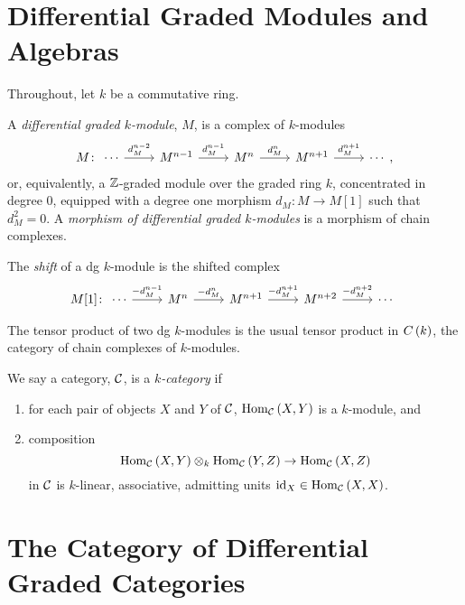 \documentclass[dissertation.tex]{subfiles}
\begin{document}
\section{Differential Graded Modules and Algebras}
{\noindent Throughout, let $k$ be a commutative ring.}
        
\begin{defn}
  A {\it differential graded $k$-module}, $M$, is a complex of $k$-modules
  $$M \colon \begin{tikzcd}
    \cdots \arrow{r}{d_M^{n-2}} & M^{n-1} \arrow{r}{d_M^{n-1}} & M^n \arrow{r}{d_M^n} & M^{n+1} \arrow{r}{d_M^{n+1}} & \cdots
  \end{tikzcd},$$
  or, equivalently, a $\mathbb{Z}$-graded module over the graded ring $k$, concentrated in degree 0, equipped with a degree one morphism $d_M : M \rightarrow M[1]$ such that $d_M^2 = 0$.
  A {\it morphism of differential graded $k$-modules} is a morphism of chain complexes.
  
  The {\it shift} of a dg $k$-module is the shifted complex
  $$M[1] \colon \begin{tikzcd}
    \cdots \arrow{r}{-d_M^{n-1}} & M^{n} \arrow{r}{-d_M^{n}} & M^{n+1} \arrow{r}{-d_M^{n+1}} & M^{n+2} \arrow{r}{-d_M^{n+2}} & \cdots
  \end{tikzcd}$$
  
  The tensor product of two dg $k$-modules is the usual tensor product in $C\left(k\right)$, the category of chain complexes of $k$-modules.
\end{defn}

\begin{defn}
  We say a category, $\mathcal{C}$, is a {\it $k$-category} if
  \begin{enumerate}
  \item
    for each pair of objects $X$ and $Y$ of $\mathcal{C}$, $\operatorname{Hom}_{\mathcal{C}}\left(X,Y\right)$ is a $k$-module, and
  \item
    composition 
    $$\operatorname{Hom}_{\mathcal{C}}\left(X,Y\right) \otimes_k \operatorname{Hom}_{\mathcal{C}}\left(Y,Z\right) \rightarrow \operatorname{Hom}_{\mathcal{C}}\left(X,Z\right)$$
    in $\mathcal{C}$ is $k$-linear, associative, admitting units $\operatorname{id}_X \in \operatorname{Hom}_{\mathcal{C}}\left(X,X\right)$.
  \end{enumerate}
\end{defn}

\section{The Category of Differential Graded Categories}
\end{document}
